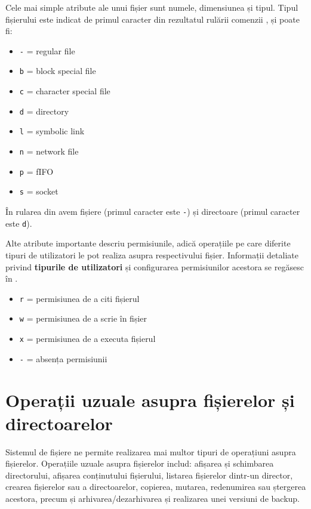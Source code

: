 Cele mai simple atribute ale unui fișier sunt numele, dimensiunea și tipul. Tipul fișierului este indicat de primul caracter din rezultatul rulării comenzii , și poate fi:

\begin{itemize}
  \item \texttt{-} = regular file
  \item \texttt{b} = block special file
  \item \texttt{c} = character special file
  \item \texttt{d} = directory
  \item \texttt{l} = symbolic link
  \item \texttt{n} = network file
  \item \texttt{p} = fIFO
  \item \texttt{s} = socket
\end{itemize}

În rularea din  avem fișiere (primul caracter este \texttt{-}) și directoare (primul caracter este \texttt{d}).

Alte atribute importante descriu permisiunile, adică operațiile pe care diferite tipuri de utilizatori le pot realiza asupra respectivului fișier. Informații detaliate privind \textbf{tipurile de utilizatori} și configurarea permisiunilor acestora se regăsesc în .

\begin{itemize}
  \item \texttt{r} = permisiunea de a citi fișierul
  \item \texttt{w} = permisiunea de a scrie în fișier
  \item \texttt{x} = permisiunea de a executa fișierul
  \item \texttt{-} = absența permisiunii
\end{itemize}

\section{Operații uzuale asupra fișierelor și directoarelor}
\label{sec:fs:file-ops}

Sistemul de fișiere ne permite realizarea mai multor tipuri de operațiuni asupra fișierelor. Operațiile uzuale asupra fișierelor includ: afișarea și schimbarea directorului, afișarea conținutului fișierului, listarea fișierelor dintr-un director, crearea fișierelor sau a directoarelor, copierea, mutarea, redenumirea sau ștergerea acestora, precum și arhivarea/dezarhivarea și realizarea unei versiuni de backup.

